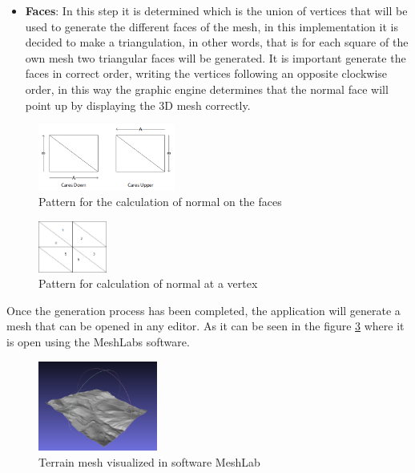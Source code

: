 \documentclass[10pt,a4paper,twocolumn,twoside]{article}
\begin{document}
\begin{itemize}
  \item \textbf{Faces}: In this step it is determined which is the union of vertices that will be used to generate the different faces of the mesh, in this implementation it is decided to make a triangulation, in other words, that is for each square of the own mesh two triangular faces will be generated. It is important generate the faces in correct order, writing the vertices following an opposite clockwise order, in this way the graphic engine determines that the normal face will point up by displaying the 3D mesh correctly.
\end{itemize}

\begin{figure}[!h]
\centering
  	\includegraphics[width=0.4\textwidth]{caranormal}
	\caption{Pattern for the calculation of normal on the faces}
	\label{fig-normalcara}
\end{figure}

\begin{figure}[!h]
\centering
  	\includegraphics[width=0.2\textwidth]{vertexnormal}
	\caption{Pattern for calculation of normal at a vertex}
	\label{fig-normalvertex}
\end{figure}

Once the generation process has been completed, the application will generate a mesh that can be opened in any editor. As it can be seen in the figure \ref{fig-meshlab} where it is open using the MeshLabs software.

\begin{figure}[!h]
\centering
  	\includegraphics[width=0.35\textwidth]{mesh_example_meshlab}
	\caption{Terrain mesh visualized in software MeshLab}
	\label{fig-meshlab}
\end{figure}
\end{document}
